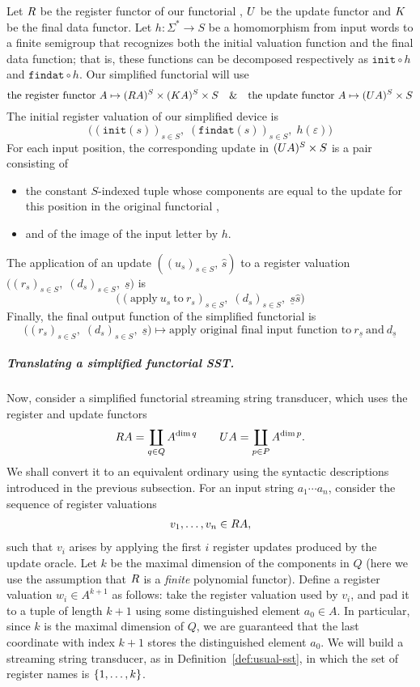 Let $\functorr$ be the register functor of our functorial \sst, $\functoru$ be the update functor and $\functork$ be the final data functor. Let $h\colon \Sigma^* \to S$ be a homomorphism from input words to a finite semigroup that recognizes both the initial valuation function and the final data function; that is, these functions can be decomposed respectively as $\mathtt{init}\circ h$ and $\mathtt{findat}\circ h$. Our simplified functorial \sst will use
\[ \text{the register functor}\ A \mapsto (\functorr A)^S \times (\functork A)^S \times S \quad\text{\&}\quad \text{the update functor}\ A \mapsto (\functoru A)^S \times S \]
The initial register valuation of our simplified device is
\[ \big((\mathtt{init}(s))_{s\in S},\; (\mathtt{findat}(s))_{s\in S},\; h(\varepsilon)\big) \]
For each input position, the corresponding update in $(\functoru A)^S \times S$ is a pair consisting of
\begin{itemize}
  \item the constant $S$-indexed tuple whose components are equal to the update for this position in the original functorial \sst,
  \item and of the image of the input letter by $h$.
\end{itemize}
The application of an update $((u_s)_{s\in S},\, \widehat{s})$ to a register valuation $\big((r_s)_{s\in S},\; (d_s)_{s\in S},\; \underline{s}\big)$ is
\[ \big((\text{apply}\ u_s\ \text{to}\ r_s)_{s\in S},\; (d_s)_{s\in S},\; \underline{s}\widehat{s}\big) \]
Finally, the final output function of the simplified functorial \sst is
\[ \big((r_s)_{s\in S},\; (d_s)_{s\in S},\; \underline{s}\big) \mapsto \text{apply original final input function to}\ r_{\underline{s}}\ \text{and}\ d_{\underline{s}}  \]

\subparagraph{Translating a simplified functorial SST.}

Now, consider a simplified functorial streaming string transducer, which uses the register and update functors 
\begin{align*} 
\functorr A = \coprod_{q \in Q} A^{\dim q} \qquad 
\functoru A = \coprod_{p \in P} A^{\dim p}.
\end{align*}
We shall convert it to an equivalent ordinary \sst using the syntactic descriptions introduced in the previous subsection.
For an input string $a_1 \cdots a_n$, consider the sequence of register valuations 
\begin{align*}
v_1,\ldots,v_n \in \functorr A,
\end{align*}
such that $v_i$ arises by applying the first $i$ register updates produced by the update oracle. Let $k$ be the maximal dimension of the components in $Q$ (here we use the assumption that $\functorr$ is a \emph{finite} polynomial functor). Define a register valuation $w_i \in A^{k+1}$ as follows: take the register valuation used by $v_i$, and pad it to a tuple of length  $k+1$ using some distinguished element $a_0 \in A$. In particular, since $k$ is the maximal dimension of $Q$, we are guaranteed that the last coordinate with index $k+1$ stores the distinguished element $a_0$. We will build a streaming string transducer, as in Definition~\ref{def:usual-sst}, in which the set of register names is $\{1,\ldots,k\}$. 

